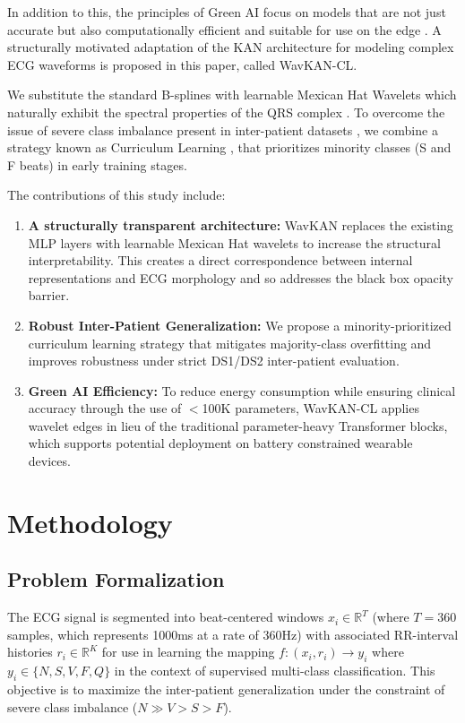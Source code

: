 \documentclass[pdflatex,sn-mathphys-num]{sn-jnl}
\theoremstyle{thmstyleone}
\theoremstyle{thmstyletwo}
\theoremstyle{thmstylethree}
\begin{document}
In addition to this, the principles of Green AI focus on models that are not just accurate but also computationally efficient and suitable for use on the edge \cite{farag_tiny_2023}. A structurally motivated adaptation of the KAN architecture for modeling complex ECG waveforms is proposed in this paper, called WavKAN-CL.

We substitute the standard B-splines with learnable Mexican Hat Wavelets which naturally exhibit the spectral properties of the QRS complex \cite{addison_wavelet_2005}. To overcome the issue of severe class imbalance present in inter-patient datasets \cite{xiao_deep_2023, bae_handling_2025}, we combine a strategy known as Curriculum Learning \cite{schmale_curriculum_2025}, that prioritizes minority classes (S and F beats) in early training stages.

The contributions of this study include:
\begin{enumerate}
    \item \textbf{A structurally transparent architecture:} WavKAN replaces the existing MLP layers with learnable Mexican Hat wavelets to increase the structural interpretability. This creates a direct correspondence between internal representations and ECG morphology and so addresses the black box opacity barrier.
    \item \textbf{Robust Inter-Patient Generalization:} We propose a minority-prioritized curriculum learning strategy that mitigates majority-class overfitting and improves robustness under strict DS1/DS2 inter-patient evaluation.
    \item \textbf{Green AI Efficiency:} To reduce energy consumption while ensuring clinical accuracy through the use of $<$100K parameters, WavKAN-CL applies wavelet edges in lieu of the traditional parameter-heavy Transformer blocks, which supports potential deployment on battery constrained wearable devices.
\end{enumerate}

\section{Methodology}
\label{sec:methods}

\subsection{Problem Formalization}
The ECG signal is segmented into beat-centered windows $x_i \in \mathbb{R}^T$ (where $T = 360$ samples, which represents 1000ms at a rate of 360Hz) with associated RR-interval histories $r_i \in \mathbb{R}^K$ for use in learning the mapping $f : (x_i, r_i) \to y_i$ where $y_i \in \{N, S, V, F, Q\}$ in the context of supervised multi-class classification. This objective is to maximize the inter-patient generalization under the constraint of severe class imbalance ($N \gg V > S > F$).
\end{document}

